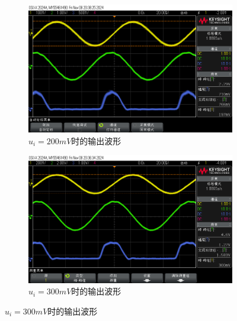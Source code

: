 \documentclass[UTF8]{ctexart}
\begin{document}
\begin{figure}[H]
    \centering
    \begin{subfigure}[c]{0.45\textwidth}
        \centering
        \includegraphics[width=\textwidth]{pics/51.png}
        \caption{$u_i=200mV$时的输出波形}\label{fig:51}
    \end{subfigure}
    \begin{subfigure}[c]{0.45\textwidth}
        \centering
        \includegraphics[width=\textwidth]{pics/52.png}
        \caption{$u_i=300mV$时的输出波形}\label{fig:52}
    \end{subfigure}


\end{figure}
\end{document}
